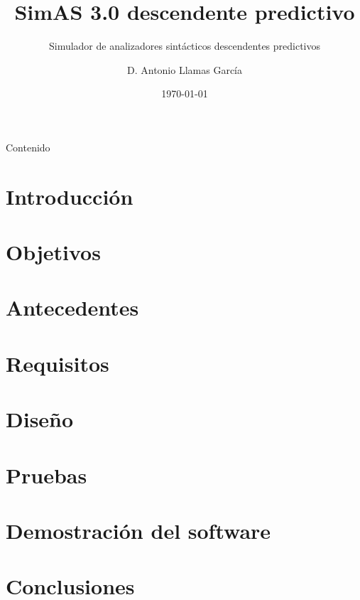 \documentclass[aspectratio=169]{beamer}
\title{SimAS 3.0 descendente predictivo}
\subtitle{Simulador de analizadores sintácticos descendentes predictivos}
\author{D. Antonio Llamas García}
\date{\today}
\begin{document}


\begin{frame}{Contenido}
  \tableofcontents
\end{frame}

\section{Introducción}


\section{Objetivos}


\section{Antecedentes}


\section{Requisitos}


\section{Diseño}


\section{Pruebas}


\section{Demostración del software}


\section{Conclusiones}



\end{document}
